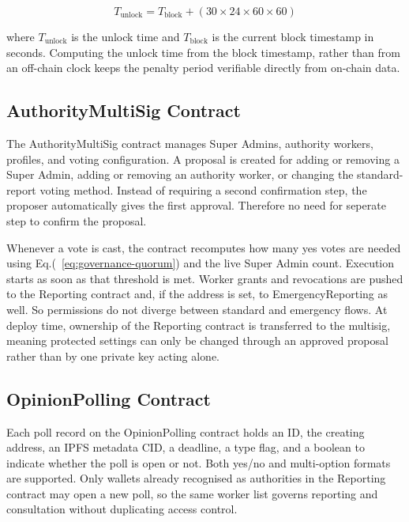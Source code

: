\begin{equation}
    T_{\mathrm{unlock}} = T_{\mathrm{block}} + ( 30 \times 24 \times 60 \times 60)
    \label{eq:emergency-penalty}
\end{equation}

where \(T_{\mathrm{unlock}}\) is the unlock time and \(T_{\mathrm{block}}\) is the current block timestamp in seconds. Computing the unlock time from the block timestamp, rather than from an off-chain clock keeps the penalty period verifiable directly from on-chain data.

\subsection{AuthorityMultiSig Contract}
\label{subsec:multisig-contract}

The AuthorityMultiSig contract manages Super Admins, authority workers, profiles, and voting configuration. A proposal is created for adding or removing a Super Admin, adding or removing an authority worker, or changing the standard-report voting method. Instead of requiring a second confirmation step, the proposer automatically gives the first approval. Therefore no need for seperate step to confirm the proposal.

Whenever a vote is cast, the contract recomputes how many yes votes are needed using Eq.(~\ref{eq:governance-quorum}) and the live Super Admin count. Execution starts as soon as that threshold is met. Worker grants and revocations are pushed to the Reporting contract and, if the address is set, to EmergencyReporting as well. So permissions do not diverge between standard and emergency flows. At deploy time, ownership of the Reporting contract is transferred to the multisig, meaning protected settings can only be changed through an approved proposal rather than by one private key acting alone.

\subsection{OpinionPolling Contract}
\label{subsec:polling-contract}

Each poll record on the OpinionPolling contract holds an ID, the creating address, an \ac{IPFS} metadata \ac{CID}, a deadline, a type flag, and a boolean to indicate whether the poll is open or not. Both yes/no and multi-option formats are supported. Only wallets already recognised as authorities in the Reporting contract may open a new poll, so the same worker list governs reporting and consultation without duplicating access control.

